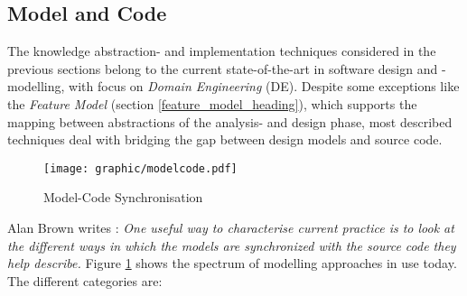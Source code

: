 %
%
%
%
%
%
%

\subsection{Model and Code}
\label{model_and_code_heading}

The knowledge abstraction- and implementation techniques considered in the
previous sections belong to the current state-of-the-art in software design and
-modelling, with focus on \emph{Domain Engineering} (DE). Despite some
exceptions like the \emph{Feature Model} (section \ref{feature_model_heading}),
which supports the mapping between abstractions of the analysis- and design
phase, most described techniques deal with bridging the gap between design
models and source code.

\begin{figure}[ht]
    \begin{center}
        \texttt{[image: graphic/modelcode.pdf]}
        \caption{Model-Code Synchronisation \cite[diagram by John Daniels]{brown2004}}
        \label{modelcode_figure}
    \end{center}
\end{figure}

Alan Brown writes \cite{brown2004}: \textit{One useful way to characterise current
practice is to look at the different ways in which the models are synchronized
with the source code they help describe.} Figure \ref{modelcode_figure} shows
the spectrum of modelling approaches in use today. The different categories
\cite{brown2004} are:

